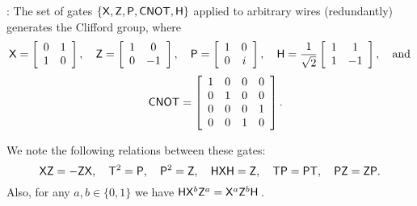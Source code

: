 
%
%


\begin{definition}
\label{defn:Clifford+T:family}
 : The set of gates $\{{\sf X}, {\sf Z}, {\sf P}, {\sf CNOT},{\sf H}\}$ applied to arbitrary wires (redundantly) generates the Clifford group, where
$${\sf X} = \left[\begin{array}{cc} 0 & 1\\ 1 & 0\end{array}\right],
\quad{\sf Z} = \left[\begin{array}{cc} 1 & 0\\ 0 & -1\end{array}\right],
\quad{\sf P} = \left[\begin{array}{cc} 1 & 0\\ 0 & i\end{array}\right],
 \quad{\sf H} = \frac{1}{\sqrt{2}}\left[\begin{array}{cc}1 & 1\\1 & -1\end{array}\right], \quad\mbox{and}$$
$$\quad{\sf CNOT} = \left[\begin{array}{cccc} 1 & 0 & 0 & 0\\ 0 & 1 & 0 & 0\\ 0 & 0 & 0 & 1\\ 0 & 0 & 1 & 0\end{array}\right].$$
\end{definition}
We note the following relations between these gates:
$${\sf X}{\sf Z} = - {\sf Z}{\sf X},\quad {\sf T}^2={\sf P},\quad{\sf P}^2={\sf Z},\quad{\sf H}{\sf X}{\sf H}={\sf Z},\quad {\sf T}{\sf P}={\sf P}{\sf T},\quad{\sf P}{\sf Z}={\sf Z}{\sf P}.$$
Also, for any $a,b\in\{0,1\}$ we have
${\sf H}{\sf X}^b{\sf Z}^a={\sf X}^a{\sf Z}^b {\sf H}$\,.

